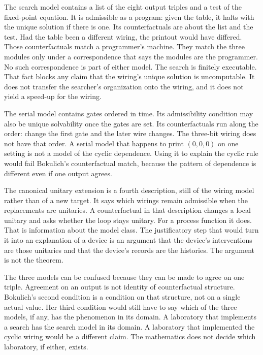 \documentclass[12pt]{article}
\begin{document}
The search model contains a list of the eight output triples and a test of the fixed-point equation. It is admissible as a program: given the table, it halts with the unique solution if there is one. Its counterfactuals are about the list and the test. Had the table been a different wiring, the printout would have differed. Those counterfactuals match a programmer's machine. They match the three modules only under a correspondence that says the modules are the programmer. No such correspondence is part of either model. The search is finitely executable. That fact blocks any claim that the wiring's unique solution is uncomputable. It does not transfer the searcher's organization onto the wiring, and it does not yield a speed-up for the wiring.

The serial model contains gates ordered in time. Its admissibility condition may also be unique solvability once the gates are set. Its counterfactuals run along the order: change the first gate and the later wire changes. The three-bit wiring does not have that order. A serial model that happens to print \((0,0,0)\) on one setting is not a model of the cyclic dependence. Using it to explain the cyclic rule would fail Bokulich's counterfactual match, because the pattern of dependence is different even if one output agrees.

The canonical unitary extension is a fourth description, still of the wiring model rather than of a new target. It says which wirings remain admissible when the replacements are unitaries. A counterfactual in that description changes a local unitary and asks whether the loop stays unitary. For a process function it does. That is information about the model class. The justificatory step that would turn it into an explanation of a device is an argument that the device's interventions are those unitaries and that the device's records are the histories. The argument is not the theorem.

The three models can be confused because they can be made to agree on one triple. Agreement on an output is not identity of counterfactual structure. Bokulich's second condition is a condition on that structure, not on a single actual value. Her third condition would still have to say which of the three models, if any, has the phenomenon in its domain. A laboratory that implements a search has the search model in its domain. A laboratory that implemented the cyclic wiring would be a different claim. The mathematics does not decide which laboratory, if either, exists.
\end{document}
